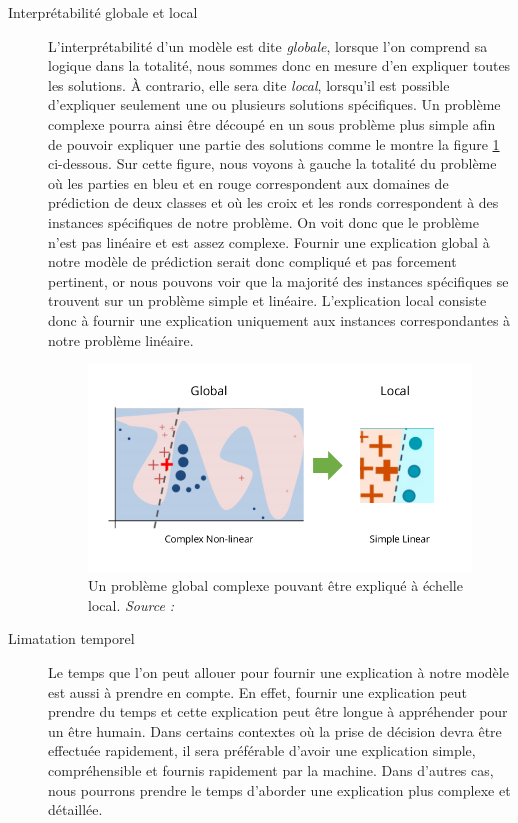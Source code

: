 \begin{description}
\item[Interprétabilité globale et local] L'interprétabilité d'un modèle est dite \textit{globale}, lorsque l'on comprend sa logique dans la totalité, nous sommes donc en mesure d'en expliquer toutes les solutions. À contrario, elle sera dite \textit{local}, lorsqu'il est possible d'expliquer seulement une ou plusieurs solutions spécifiques. Un problème complexe pourra ainsi être découpé en un sous problème plus simple afin de pouvoir expliquer une partie des solutions comme le montre la figure \ref{globalVSlocal} ci-dessous. Sur cette figure, nous voyons à gauche la totalité du problème où les parties en bleu et en rouge correspondent aux domaines de prédiction de deux classes et où les croix et les ronds correspondent à des instances spécifiques de notre problème. On voit donc que le problème n'est pas linéaire et est assez complexe. Fournir une explication global à notre modèle de prédiction serait donc compliqué et pas forcement pertinent, or nous pouvons voir que la majorité des instances spécifiques se trouvent sur un problème simple et linéaire. L'explication local consiste donc à fournir une explication uniquement aux instances correspondantes à notre problème linéaire.
\begin{figure}[h]
\centering
\includegraphics[scale=0.4]{src_img/globalVSlocal.png}
\caption{Un problème global complexe pouvant être expliqué à échelle local. \textit{Source : \cite{limePaper}}}
\label{globalVSlocal}
\end{figure}

\item[Limatation temporel] Le temps que l'on peut allouer pour fournir une explication à notre modèle est aussi à prendre en compte. En effet, fournir une explication peut prendre du temps et cette explication peut être longue à appréhender pour un être humain. Dans certains contextes où la prise de décision devra être effectuée rapidement, il sera préférable d'avoir une explication simple, compréhensible et fournis rapidement par la machine. Dans d'autres cas, nous pourrons prendre le temps d'aborder une explication plus complexe et détaillée.


\end{description}
